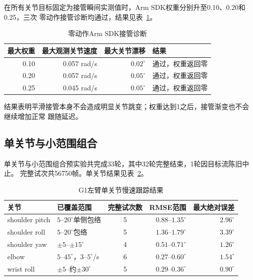 在所有关节目标固定为接管瞬间实测值时，Arm SDK权重分别升至0.10、0.20和0.25，三次
零动作接管诊断均通过，结果见表~\ref{tab:ch7_takeover_diagnostic}。

\begin{table}[htbp]
  \centering
  \caption{零动作Arm SDK接管诊断}
  \label{tab:ch7_takeover_diagnostic}
  \begin{tabular}{@{}rrrl@{}}
    \toprule
    最大权重 & 最大观测关节速度 & 最大关节漂移 & 结果 \\
    \midrule
    0.10 & 0.057 rad/s & $0.02^\circ$ & 通过，权重返回零 \\
    0.20 & 0.057 rad/s & $0.05^\circ$ & 通过，权重返回零 \\
    0.25 & 0.045 rad/s & $0.05^\circ$ & 通过，权重返回零 \\
    \bottomrule
  \end{tabular}
\end{table}

结果表明平滑接管本身不会造成明显关节跳变；权重达到1之后，接管渐变也不会继续增加正常
跟随延迟。

\subsection{单关节与小范围组合}
\label{subsec:ch7_single_small_multi}

单关节与小范围组合预实验共完成33轮，其中32轮完整结束，1轮因目标流陈旧中止。
完整试次共56750帧。单关节结果见表~\ref{tab:ch7_single_joint}。

\begin{table}[htbp]
  \centering
  \small
  \caption{G1左臂单关节慢速跟踪结果}
  \label{tab:ch7_single_joint}
  \begin{tabularx}{\linewidth}{@{}lXcrr@{}}
    \toprule
    关节 & 已覆盖范围 & 完整试次数 & RMSE范围 & 最大绝对误差 \\
    \midrule
    shoulder pitch & $5$--$20^\circ$单侧包络 & 5 & $0.88$--$1.35^\circ$ & $2.96^\circ$ \\
    shoulder roll & $5$--$20^\circ$包络 & 5 & $1.36$--$1.79^\circ$ & $3.39^\circ$ \\
    shoulder yaw & $\pm5$--$\pm15^\circ$ & 4 & $0.51$--$0.71^\circ$ & $1.26^\circ$ \\
    elbow & $5$--$45^\circ$，$3$--$5^\circ$/s & 6 & $0.27$--$0.60^\circ$ & $1.54^\circ$ \\
    wrist roll & $\pm5$--约$\pm30^\circ$ & 5 & $0.29$--$0.36^\circ$ & $0.90^\circ$ \\
    \bottomrule
  \end{tabularx}
\end{table}

